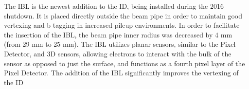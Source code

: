 \indent The IBL is the newest addition to the ID, being installed during the 2016 shutdown. It is placed directly outside the beam pipe in order to maintain good vertexing and b tagging in increased pileup environments. In order to facilitate the insertion of the IBL, the beam pipe inner radius was decreased by 4 mm (from 29 mm to 25 mm). The IBL utilizes planar sensors, similar to the Pixel Detector, and 3D sensors, allowing electrons to interact with the bulk of the sensor as opposed to just the surface, and functions as a fourth pixel layer of the Pixel Detector. The addition of the IBL significantly improves the vertexing of the ID



